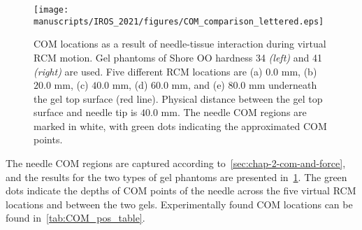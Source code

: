 \begin{figure}[h]
  \centering
  \texttt{[image: manuscripts/IROS\_2021/figures/COM\_comparison\_lettered.eps]}
  \caption{COM locations as a result of needle-tissue interaction during virtual RCM motion. Gel phantoms of Shore OO hardness 34 \textit{(left)} and 41 \textit{(right)} are used. Five different RCM locations are (a) $0.0$ mm, (b) $20.0$ mm, (c) $40.0$ mm, (d) $60.0$ mm, and (e) $80.0$ mm underneath the gel top surface (red line). Physical distance between the gel top surface and needle tip is $40.0$ mm. The needle COM regions are marked in white, with green dots indicating the approximated COM points.}
  \label{fig:com_compare}
\end{figure}

The needle COM regions are captured according to~\cref{sec:chap-2-com-and-force}, and the results for the two types of gel phantoms are presented in~\cref{fig:com_compare}. The green dots indicate the depths of COM points of the needle across the five virtual RCM locations and between the two gels. Experimentally found COM locations can be found in~\cref{tab:COM_pos_table}.


\begin{table}[h]
\centering
\caption{Experimentally determined COM locations, $E_{com}$, and simulated COM locations, $S_{com}$, for the two gel materials.}
\label{tab:COM_pos_table}
\end{table}


